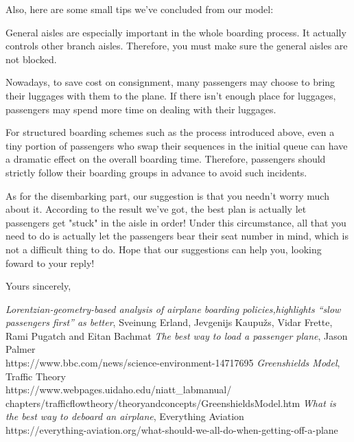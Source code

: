 \documentclass{article}
\theoremstyle{definition}
\theoremstyle{remark}
\numberwithin{equation}{section}
\begin{document}
	Also, here are some small tips we've concluded from our model:
	\begin{enumerate}

		General aisles are especially important in the whole boarding process. It actually controls other branch aisles. Therefore, you must make sure the general aisles are not blocked.

		Nowadays, to save cost on consignment, many passengers may choose to bring their luggages with them to the plane. If there isn't enough place for luggages, passengers may spend more time on dealing with their luggages.

		For structured boarding schemes such as the process introduced above, even a tiny portion of passengers who swap their sequences in the initial queue can have a dramatic effect on the overall boarding time. Therefore, passengers should strictly follow their boarding groups in advance to avoid such incidents.
	\end{enumerate}

	As for the disembarking part, our suggestion is that you needn't worry much about it. According to the result we've got, the best plan is actually let passengers get "stuck" in the aisle in order! Under this circumstance, all that you need to do is actually let the passengers bear their seat number in mind, which is not a difficult thing to do.
	Hope that our suggestions can help you, looking foward to your reply!


	Yours sincerely,



	\newpage
	\thispagestyle{empty}
	\renewcommand\refname{References}
	\begin{thebibliography}{100}
	 \textit{Lorentzian-geometry-based analysis of airplane boarding policies,highlights “slow passengers first” as better},
	Sveinung Erland, Jevgenijs Kaupužs, Vidar Frette, Rami Pugatch and  Eitan Bachmat
	 \textit{The best way to load a passenger plane}, Jason Palmer\\
	https://www.bbc.com/news/science-environment-14717695
	 \textit{Greenshields Model}, Traffic Theory\\
	https://www.webpages.uidaho.edu/niatt\_labmanual/\\chapters/trafficflowtheory/theoryandconcepts/GreenshieldsModel.htm
	 \textit{What is the best way to deboard an airplane}, Everything Aviation\\
	https://everything-aviation.org/what-should-we-all-do-when-getting-off-a-plane
	\end{thebibliography}
\end{document}
